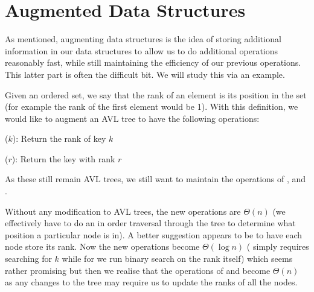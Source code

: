 \section{Augmented Data Structures}\label{sec:aug-data-struc}
As mentioned, augmenting data structures is the idea of storing additional information in our data structures to allow us to do additional operations reasonably fast, while still maintaining the efficiency of our previous operations. This latter part is often the difficult bit. We will study this via an example.

Given an ordered set, we say that the rank of an element is its position in the set (for example the rank of the first element would be 1). With this definition, we would like to augment an AVL tree to have the following operations:
\begin{minitemize}
\item {}($k$): Return the rank of key $k$
\item {}($r$): Return the key with rank $r$
\end{minitemize}
As these still remain AVL trees, we still want to maintain the operations of ,  and . 

Without any modification to AVL trees, the new operations are $\Theta(n)$ (we effectively have to do an in order traversal through the tree to determine what position a particular node is in). A better suggestion appears to be to have each node store its rank. Now the new operations become $\Theta(\log n)$ ( simply requires searching for $k$ while for  we run binary search on the rank itself) which seems rather promising but then we realise that the operations of  and  become $\Theta(n)$ as any changes to the tree may require us to update the ranks of all the nodes. 


